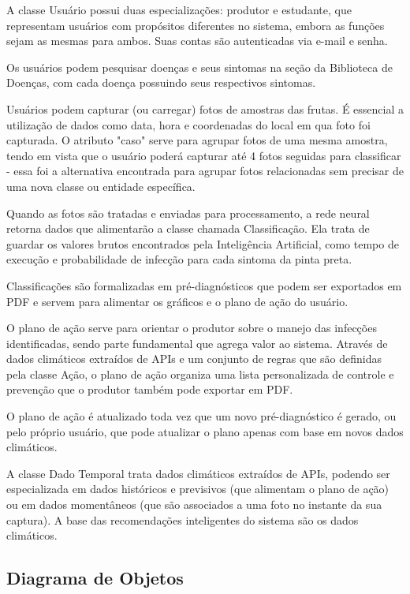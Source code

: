 \documentclass[
  a4paper,%
  12pt,%
  english,%
  brazilian,%
]{article}
\begin{document}
    A classe Usuário possui duas especializações: produtor e estudante, que representam usuários com propósitos diferentes no sistema, embora as funções sejam as mesmas para ambos.
    Suas contas são autenticadas via e-mail e senha.

     Os usuários podem pesquisar doenças e seus sintomas na seção da Biblioteca de Doenças, com cada doença possuindo seus respectivos sintomas.

     Usuários podem capturar (ou carregar) fotos de amostras das frutas. É essencial a utilização de dados como data, hora e coordenadas do local em qua foto foi capturada. 
     O atributo "caso" serve para agrupar fotos de uma mesma amostra, tendo em vista que o usuário poderá capturar até 4 fotos seguidas para classificar - essa foi a alternativa encontrada para agrupar fotos relacionadas sem precisar de uma nova classe ou entidade específica.

     Quando as fotos são tratadas e enviadas para processamento, a rede neural retorna dados que alimentarão a classe chamada Classificação. Ela trata de guardar os valores brutos encontrados pela Inteligência Artificial, como tempo de execução e probabilidade de infecção para cada sintoma da pinta preta.

     Classificações são formalizadas em pré-diagnósticos que podem ser exportados em PDF e servem para alimentar os gráficos e o plano de ação do usuário.

     O plano de ação serve para orientar o produtor sobre o manejo das infecções identificadas, sendo parte fundamental que agrega valor ao sistema. Através de dados climáticos extraídos de APIs e um conjunto de regras que são definidas pela classe Ação, o plano de ação organiza uma lista personalizada de controle e prevenção que o produtor também pode exportar em PDF.
     
     O plano de ação é atualizado toda vez que um novo pré-diagnóstico é gerado, ou pelo próprio usuário, que pode atualizar o plano apenas com base em novos dados climáticos. 

     A classe Dado Temporal trata dados climáticos extraídos de APIs, podendo ser especializada em dados históricos e previsivos (que alimentam o plano de ação) ou em dados momentâneos (que são associados a uma foto no instante da sua captura). A base das recomendações inteligentes do sistema são os dados climáticos.


    \subsection*{Diagrama de Objetos}
\end{document}
